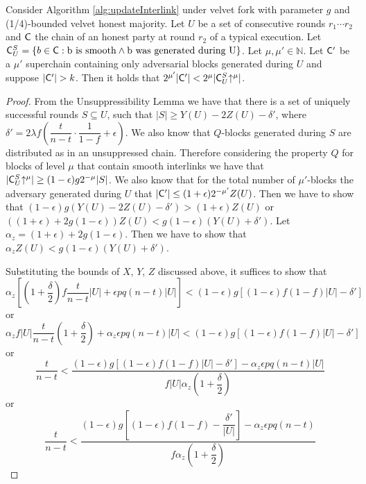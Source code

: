 \begin{lemma}\label{lem:claim3_lemma}
   Consider Algorithm \ref{alg:updateInterlink} under velvet fork with parameter $g$ and (1/4)-bounded velvet honest majority. Let $U$ be a set of consecutive rounds $r_1 \cdots r_2$ and $\mathsf{C}$ the chain of an honest party at round $r_2$ of a typical execution. Let $\mathsf{C}^S_U = \{b \in \mathsf{C}: \text{b is smooth} \land \text{b was generated during U} \}$. Let $\mu, \mu' \in \mathbb{N}$.
   Let $\mathsf{C}'$ be a $\mu'$ superchain containing only adversarial blocks generated during $U$ and suppose $\lvert \mathsf{C}' \rvert > k$. Then it holds that
   $2^{\mu'}\lvert \mathsf{C}' \rvert < 2^{\mu}\lvert \mathsf{C}^S_U\negthickspace\uparrow^{\mu} \rvert $.
\end{lemma}
\begin{proof}
  From the Unsuppressibility Lemma we have that there is a set of uniquely
  successful rounds $S \subseteq U$, such that
  $\lvert S \rvert \geq Y(U) - 2Z(U) - \delta'$, where
  $\delta' = 2 \lambda f (\dfrac{t}{n-t} \cdot \dfrac{1}{1-f} + \epsilon)$.
  We also know that $Q$-blocks generated during $S$ are distributed as in an
  unsuppressed chain. Therefore considering the property $Q$ for blocks of
  level $\mu$ that contain smooth interlinks we have that
  $\lvert \mathsf{C}^S_U\negthickspace\uparrow^{\mu} \rvert \geq (1-\epsilon)g2^{-\mu} \lvert S \rvert$.
  We also know that for the total number of $\mu'$-blocks the adversary
  generated during $U$ that
  $\lvert \mathsf{C}' \rvert \leq (1+\epsilon)2^{-\mu'}Z(U)$.
  Then we have to show that
  $(1-\epsilon)g (Y(U) - 2Z(U) - \delta' ) > (1+\epsilon)Z(U)$ or
  $((1+\epsilon)+2g(1-\epsilon))Z(U) < g(1-\epsilon)(Y(U) + \delta')$.
  Let $\alpha_z = (1+\epsilon)+2g(1-\epsilon)$. Then we have to show that
  $\alpha_z Z(U) < g(1-\epsilon)(Y(U) + \delta')$.

Substituting the bounds of $X$, $Y$, $Z$ discussed above, it suffices to show that
\begin{equation*}
    \alpha_z[(1+\dfrac{\delta}{2})f \dfrac{t}{n-t} \lvert U \rvert + \epsilon pq(n-t) \lvert U \rvert ] < (1- \epsilon)g[ (1-\epsilon)f(1-f) \lvert U \rvert - \delta' ]
\end{equation*} or
\begin{equation*}
        \alpha_z f \lvert U \rvert \dfrac{t}{n-t}(1 + \dfrac{\delta}{2}) + \alpha_z \epsilon pq(n-t) \lvert U \rvert < (1- \epsilon)g[ (1-\epsilon)f(1-f) \lvert U \rvert - \delta' ]
\end{equation*} or
\begin{equation*}
        \dfrac{t}{n-t} < \dfrac{ (1- \epsilon)g[ (1-\epsilon)f(1-f) \lvert U \rvert - \delta' ] - \alpha_z \epsilon pq(n-t) \lvert U \rvert }  { f \lvert U \rvert \alpha_z (1 + \dfrac{\delta}{2})}
\end{equation*} or
\begin{equation*}
    \dfrac{t}{n-t} < \dfrac{  (1- \epsilon)g[ (1-\epsilon)f(1-f) - \dfrac{\delta'}{\lvert U \rvert} ] - \alpha_z \epsilon pq(n-t) }  { f \alpha_z (1 + \dfrac{\delta}{2})}
\end{equation*}


\end{proof}
